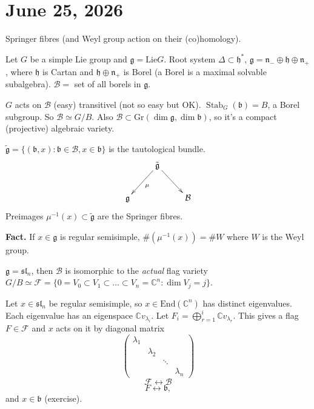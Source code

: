 \section{June 25, 2026}
\label{section-june25-2026}

\noindent
Springer fibres 
(and Weyl group action on their
(co)homology).

\medskip\noindent
Let $G$ be a simple Lie group
and $\mathfrak{g}=\text{Lie} G$.
Root system $\Delta \subset \mathfrak{h}^*$,
$\mathfrak{g}=\mathfrak{n}_- \oplus
\mathfrak{h} \oplus \mathfrak{n}_+$,
where $\mathfrak{h}$ is Cartan
and $\mathfrak{h}\oplus \mathfrak{n}_+$
is Borel (a Borel is a maximal solvable
subalgebra).
$\mathcal{B}=$ set of all borels in
$\mathfrak{g}$.

$G$ acts on $\mathcal{B}$ (easy)
transitivel (not so easy but OK).
$\operatorname{Stab}_G(\mathfrak{b})=B$,
a Borel subgroup.
So $\mathcal{B}\simeq G/B$.
Also $\mathcal{B} \subset \text{Gr}
(\dim \mathfrak{g}, \dim \mathfrak{b})$,
so it's a compact (projective)
algebraic variety.

$\tilde{\mathfrak{g}}=
\{(\mathfrak{b},x):\mathfrak{b} \in 
\mathcal{B}, x \in \mathfrak{b}\}$ is
the tautological bundle.
$$
\xymatrix{
&  \tilde{\mathfrak{g}}
\ar[dl]^{\mu}\ar[dr]\\
\mathfrak{g}&  &  \mathcal{B}
}
$$
Preimages $\mu^{-1}(x) \subset \tilde{\mathfrak{g}}$
are the Springer fibres.

{\bf Fact.} If $x \in \mathfrak{g}$
is regular semisimple,
$\# (\mu^{-1}(x))=\# W$ where
$W$ is the Weyl group.

\begin{example}
\label{example-sln-borels}
$\mathfrak{g} = \mathfrak{sl}_n$,
then $\mathcal{B}$ is isomorphic to the
{\it actual} flag variety
$G/B \simeq \mathcal{F}
=\{0=V_0 \subset V_1\subset
… \subset V_n = \mathbb{C}^n:
\dim V_j = j\}$.
\end{example}

\noindent
Let $x \in \mathfrak{sl}_n$ be
regular semisimple, so $x \in
\text{End}(\mathbb{C}^n)$ has distinct
eigenvalues. Each eigenvalue
has an eigenspace $\mathbb{C}v_{\lambda_i}$.
Let $F_i = \bigoplus_{r=1}^i
\mathbb{C}v_{\lambda_r}$.
This gives a flag $F \in \mathcal{F}$
and $x$ acts on it by diagonal
matrix
$$
\begin{pmatrix}
\lambda_1\\
& \lambda_2\\
& & \ddots\\
& & & \lambda_n
\end{pmatrix}
$$
$$
\mathcal{F} \leftrightarrow \mathcal{B}
$$
$$
F \leftrightarrow \mathfrak{b},
$$
and $x \in \mathfrak{b}$ (exercise).

